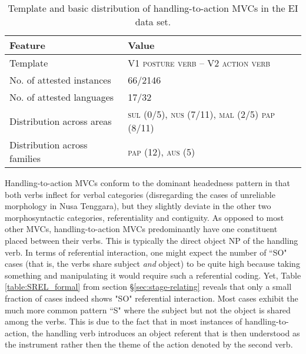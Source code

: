 \begin{table}


\begin{tabular}{ll}
\lsptoprule
Feature&Value\tabularnewline
\hline
Template&V1 \textsc{posture verb} -- V2 \textsc{action verb}\tabularnewline
No. of attested instances& 66/2146 \tabularnewline
No. of attested languages& 17/32 \tabularnewline
Distribution across areas& \textsc{sul} (0/5), \textsc{nus} (7/11), \textsc{mal} (2/5) \textsc{pap} (8/11) \tabularnewline
Distribution across families& \textsc{pap} (12), \textsc{aus} (5) \tabularnewline
\hline
\end{tabular}
\caption[Template and basic distribution of handling-to-action MVCs]{Template and basic distribution of handling-to-action MVCs in the EI data set.}
\label{table:handling-to-action}
\end{table}


Handling-to-action MVCs conform to the dominant headedness pattern in that both verbs inflect for verbal categories (disregarding the cases of unreliable morphology in Nusa Tenggara), but they slightly deviate in the other two morphosyntactic categories, referentiality and contiguity. As opposed to most other MVCs, handling-to-action MVCs predominantly have one constituent placed between their verbs. This is typically the direct object NP of the handling verb. In terms of referential interaction, one might expect the number of ``SO" cases (that is, the verbs share subject \emph{and} object) to be quite high because taking something and manipulating it would require such a referential coding. Yet, Table \ref{table:SREL_formal} from section §\ref{sec:stage-relating} reveals that only a small fraction of cases indeed shows "SO" referential interaction. Most cases exhibit the much more common pattern ``S" where the subject but not the object is shared among the verbs. This is due to the fact that in most instances of handling-to-action, the handling verb introduces an object referent that is then understood as the instrument rather then the theme of the action denoted by the second verb. 


